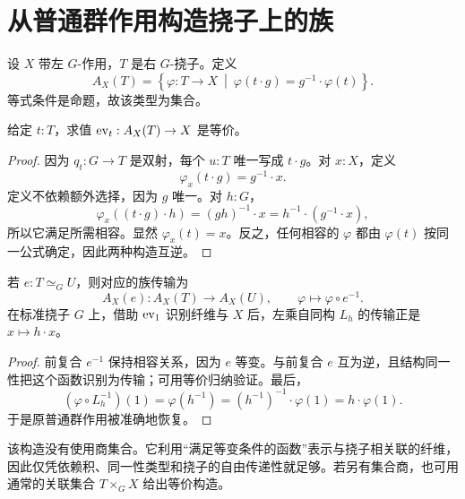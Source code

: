 \section{从普通群作用构造挠子上的族}
\begin{definition}[与挠子相联系的集合]
设 $X$ 带左 $G$-作用，$T$ 是右 $G$-挠子。定义
\[
A_X(T)=\left\{\varphi:T\to X\ \middle|\ 
\varphi(t\cdot g)=g^{-1}\cdot\varphi(t)\right\}.
\]
等式条件是命题，故该类型为集合。
\end{definition}
\begin{lemma}[求值平凡化]
给定 $t:T$，求值 $\operatorname{ev}_t:A_X(T)\to X$ 是等价。
\end{lemma}
\begin{proof}
因为 $q_t:G\to T$ 是双射，每个 $u:T$ 唯一写成 $t\cdot g$。对 $x:X$，定义
\[
\varphi_x(t\cdot g)=g^{-1}\cdot x.
\]
定义不依赖额外选择，因为 $g$ 唯一。对 $h:G$，
\[
\varphi_x((t\cdot g)\cdot h)
=(gh)^{-1}\cdot x
=h^{-1}\cdot(g^{-1}\cdot x),
\]
所以它满足所需相容。显然 $\varphi_x(t)=x$。反之，任何相容的 $\varphi$ 都由 $\varphi(t)$ 按同一公式确定，因此两种构造互逆。
\end{proof}
\begin{proposition}[挠子同构上的传输]
若 $e:T\simeq_G U$，则对应的族传输为
\[
A_X(e):A_X(T)\to A_X(U),
\qquad \varphi\longmapsto\varphi\circ e^{-1}.
\]
在标准挠子 $G$ 上，借助 $\operatorname{ev}_1$ 识别纤维与 $X$ 后，左乘自同构 $L_h$ 的传输正是 $x\mapsto h\cdot x$。
\end{proposition}
\begin{proof}
前复合 $e^{-1}$ 保持相容关系，因为 $e$ 等变。与前复合 $e$ 互为逆，且结构同一性把这个函数识别为传输；可用等价归纳验证。最后，
\[
(\varphi\circ L_h^{-1})(1)=\varphi(h^{-1})
=(h^{-1})^{-1}\cdot\varphi(1)=h\cdot\varphi(1).
\]
于是原普通群作用被准确地恢复。
\end{proof}
\begin{remark}
该构造没有使用商集合。它利用“满足等变条件的函数”表示与挠子相关联的纤维，因此仅凭依赖积、同一性类型和挠子的自由传递性就足够。若另有集合商，也可用通常的关联集合 $T\times_G X$ 给出等价构造。
\end{remark}

